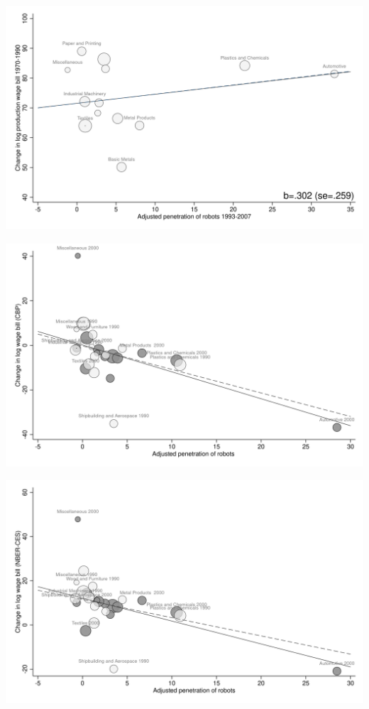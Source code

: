 \documentclass{article}
\begin{document}
\begin{center}\includegraphics[scale=0.15]{output/figure_industry_payblue_placebo.png}\end{center}
\begin{center}\includegraphics[scale=0.15]{output/figure_industry_pay_cbp.png}\end{center}
\begin{center}\includegraphics[scale=0.15]{output/figure_industry_pay_nber.png}\end{center}
\end{document}
